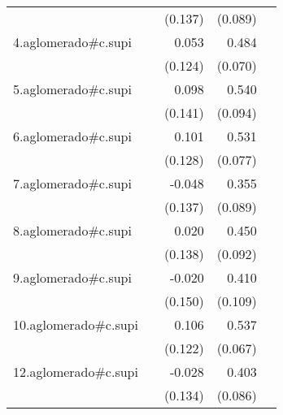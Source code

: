 {\begin{longtable}{l*{4}{D{.}{.}{-1}}}
            &                     &     (0.137)         &     (0.089)         &                     \\
\addlinespace
4.aglomerado#c.supi&                     &       0.053         &       0.484\sym{***}&                     \\
            &                     &     (0.124)         &     (0.070)         &                     \\
\addlinespace
5.aglomerado#c.supi&                     &       0.098         &       0.540\sym{***}&                     \\
            &                     &     (0.141)         &     (0.094)         &                     \\
\addlinespace
6.aglomerado#c.supi&                     &       0.101         &       0.531\sym{***}&                     \\
            &                     &     (0.128)         &     (0.077)         &                     \\
\addlinespace
7.aglomerado#c.supi&                     &      -0.048         &       0.355\sym{***}&                     \\
            &                     &     (0.137)         &     (0.089)         &                     \\
\addlinespace
8.aglomerado#c.supi&                     &       0.020         &       0.450\sym{***}&                     \\
            &                     &     (0.138)         &     (0.092)         &                     \\
\addlinespace
9.aglomerado#c.supi&                     &      -0.020         &       0.410\sym{***}&                     \\
            &                     &     (0.150)         &     (0.109)         &                     \\
\addlinespace
10.aglomerado#c.supi&                     &       0.106         &       0.537\sym{***}&                     \\
            &                     &     (0.122)         &     (0.067)         &                     \\
\addlinespace
12.aglomerado#c.supi&                     &      -0.028         &       0.403\sym{***}&                     \\
            &                     &     (0.134)         &     (0.086)         &                     \\

\end{longtable}}
